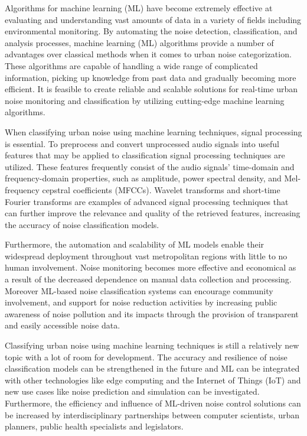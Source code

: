 \documentclass[conference]{IEEEtran}
\begin{document}
Algorithms for machine learning (ML) have become extremely effective at evaluating and understanding vast amounts of data in a variety of fields including environmental monitoring. By automating the noise detection, classification, and analysis processes, machine learning (ML) algorithms provide a number of advantages over classical methods when it comes to urban noise categorization. These algorithms are capable of handling a wide range of complicated information, picking up knowledge from past data and gradually becoming more efficient.\cite{49article}  It is feasible to create reliable and scalable solutions for real-time urban noise monitoring and classification by utilizing cutting-edge machine learning algorithms.


When classifying urban noise using machine learning techniques, signal processing is essential. To preprocess and convert unprocessed audio signals into useful features that may be applied to classification signal processing techniques are utilized.\cite{7891546} These features frequently consist of the audio signals' time-domain and frequency-domain properties, such as amplitude, power spectral density, and Mel-frequency cepstral coefficients (MFCCs). Wavelet transforms and short-time Fourier transforms are examples of advanced signal processing techniques that can further improve the relevance and quality of the retrieved features, increasing the accuracy of noise classification models. \cite{musicclassificationarticle}

Furthermore, the automation and scalability of ML models enable their widespread deployment throughout vast metropolitan regions with little to no human involvement. Noise monitoring becomes more effective and economical as a result of the decreased dependence on manual data collection and processing. Moreover ML-based noise classification systems can encourage community involvement, and support for noise reduction activities by increasing public awareness of noise pollution and its impacts through the provision of transparent and easily accessible noise data.\cite{vijayakumar2022ecg}


Classifying urban noise using machine learning techniques is still a relatively new topic with a lot of room for development. The accuracy and resilience of noise classification models can be strengthened in the future and ML can be integrated with other technologies like edge computing and the Internet of Things (IoT) and new use cases like noise prediction and simulation can be investigated.\cite{8300941} Furthermore, the efficiency and influence of ML-driven noise control solutions can be increased by interdisciplinary partnerships between computer scientists, urban planners, public health specialists and legislators.
\end{document}
